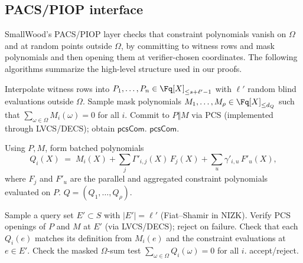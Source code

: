 \subsection{PACS/PIOP interface}
SmallWood's PACS/PIOP layer checks that constraint polynomials vanish on
\(\Omega\) and at random points outside \(\Omega\), by committing to witness
rows and mask polynomials and then opening them at verifier-chosen
coordinates. The following algorithms summarize the high-level structure used in
our proofs.

\begin{algorithm}[H]
\caption{\textsf{PACS.PIOPCommitOracle}\(_{\mathrm{Prover}}(\textsf{params})\to \textsf{pcsCom}\)}
\label{alg:pacs-commitoracle}
\begin{algorithmic}[1]
\State Interpolate witness rows into \(P_1,\ldots,P_n\in\Fq[X]_{\le s+\ell'-1}\) with \(\ell'\) random blind evaluations outside \(\Omega\).
\State Sample mask polynomials \(M_1,\ldots,M_\rho\in\Fq[X]_{\le d_Q}\) such that \(\sum_{\omega\in\Omega} M_i(\omega)=0\) for all \(i\).
\State Commit to \(P\Vert M\) via PCS (implemented through LVCS/DECS); obtain \(\textsf{pcsCom}\).
\State \Return \(\textsf{pcsCom}\).
\end{algorithmic}
\end{algorithm}

\begin{algorithm}[H]
\caption{\textsf{PACS.PIOPBatchCombine}\(_{\mathrm{Prover}}(\textsf{pcsCom},\Gamma')\to Q\)}
\label{alg:pacs-batchcombine}
\begin{algorithmic}[1]
\State Using \(P,M\), form batched polynomials
\[
Q_i(X) \;=\; M_i(X) + \sum_j \Gamma'_{i,j}(X)\,F_j(X) + \sum_u \gamma'_{i,u}\,F'_u(X),
\]
where \(F_j\) and \(F'_u\) are the parallel and aggregated constraint polynomials evaluated on \(P\).
\State \Return \(Q=(Q_1,\ldots,Q_\rho)\).
\end{algorithmic}
\end{algorithm}

\begin{algorithm}[H]
\caption{\textsf{PACS.PIOPOpenAndCheck}(\(\textsf{pcsCom},Q\)) (verifier)}
\label{alg:pacs-openandcheck}
\begin{algorithmic}[1]
\State Sample a query set \(E'\subset S\) with \(|E'|=\ell'\) (Fiat--Shamir in NIZK).
\State Verify PCS openings of \(P\) and \(M\) at \(E'\) (via LVCS/DECS); reject on failure.
\State Check that each \(Q_i(e)\) matches its definition from \(M_i(e)\) and the constraint evaluations at \(e\in E'\).
\State Check the masked \(\Omega\)-sum test \(\sum_{\omega\in\Omega} Q_i(\omega)=0\) for all \(i\).
\State \Return accept/reject.
\end{algorithmic}
\end{algorithm}

